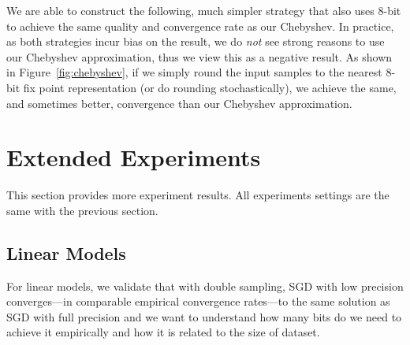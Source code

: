 \documentclass{article}
\begin{document}
We are able to construct the following,
much simpler strategy that also
uses 8-bit to achieve the same quality
and convergence rate as our
Chebyshev. In practice, as both
strategies incur bias on the result,
we do {\em not} see strong reasons to
use our Chebyshev approximation, thus
we view this as a negative result.
As shown in Figure~\ref{fig:chebyshev},
if we simply round the input samples
to the nearest 8-bit fix point
representation (or do rounding
stochastically), we achieve the
same, and sometimes better,
convergence than our Chebyshev 
approximation.

\section{Extended Experiments}

This section provides more experiment results.
All experiments settings are the same with
the previous section.

\subsection{Linear Models}

For linear models, we validate that 
with double sampling, SGD with low
precision converges---in
comparable empirical 
convergence rates---to the same solution
as SGD with full precision and we want to
understand how many bits do we need to
achieve it empirically and how it is related to 
the size of dataset.
\end{document}
